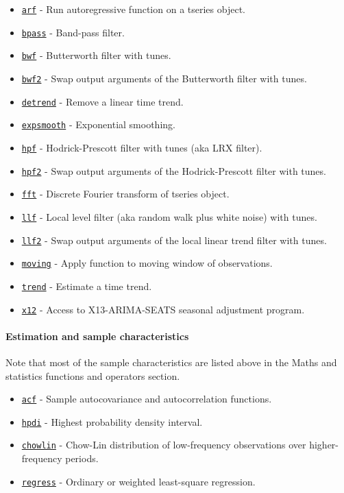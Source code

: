 \begin{itemize}
\itemsep1pt\parskip0pt
\item
  \href{tseries/arf}{\texttt{arf}} - Run autoregressive function on a
  tseries object.
\item
  \href{tseries/bpass}{\texttt{bpass}} - Band-pass filter.
\item
  \href{tseries/bwf}{\texttt{bwf}} - Butterworth filter with tunes.
\item
  \href{tseries/bwf2}{\texttt{bwf2}} - Swap output arguments of the
  Butterworth filter with tunes.
\item
  \href{tseries/detrend}{\texttt{detrend}} - Remove a linear time trend.
\item
  \href{tseries/expsmooth}{\texttt{expsmooth}} - Exponential smoothing.
\item
  \href{tseries/hpf}{\texttt{hpf}} - Hodrick-Prescott filter with tunes
  (aka LRX filter).
\item
  \href{tseries/hpf2}{\texttt{hpf2}} - Swap output arguments of the
  Hodrick-Prescott filter with tunes.
\item
  \href{tseries/fft}{\texttt{fft}} - Discrete Fourier transform of
  tseries object.
\item
  \href{tseries/llf}{\texttt{llf}} - Local level filter (aka random walk
  plus white noise) with tunes.
\item
  \href{tseries/llf2}{\texttt{llf2}} - Swap output arguments of the
  local linear trend filter with tunes.
\item
  \href{tseries/moving}{\texttt{moving}} - Apply function to moving
  window of observations.
\item
  \href{tseries/trend}{\texttt{trend}} - Estimate a time trend.
\item
  \href{tseries/x12}{\texttt{x12}} - Access to X13-ARIMA-SEATS seasonal
  adjustment program.
\end{itemize}

\paragraph{Estimation and sample
characteristics}

Note that most of the sample characteristics are listed above in the
Maths and statistics functions and operators section.

\begin{itemize}
\itemsep1pt\parskip0pt
\item
  \href{tseries/acf}{\texttt{acf}} - Sample autocovariance and
  autocorrelation functions.
\item
  \href{tseries/hpdi}{\texttt{hpdi}} - Highest probability density
  interval.
\item
  \href{tseries/chowlin}{\texttt{chowlin}} - Chow-Lin distribution of
  low-frequency observations over higher-frequency periods.
\item
  \href{tseries/regress}{\texttt{regress}} - Ordinary or weighted
  least-square regression.
\end{itemize}

